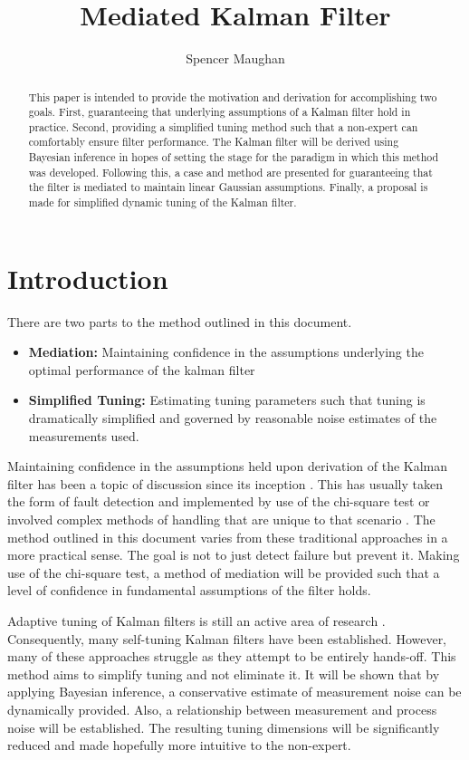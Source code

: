 \documentclass[a4paper]{article}
\title{Mediated Kalman Filter}
\author{Spencer Maughan}
\date{}
\begin{document}
	\maketitle

	\begin{abstract}
		This paper is intended to provide the motivation and derivation for accomplishing two goals. First, guaranteeing that underlying assumptions of a Kalman filter hold in practice. Second, providing a simplified tuning method such that a non-expert can comfortably ensure filter performance. The Kalman filter will be derived using Bayesian inference in hopes of setting the stage for the paradigm in which this method was developed. Following this, a case and method are presented for guaranteeing that the filter is mediated to maintain linear Gaussian assumptions. Finally, a proposal is made for simplified dynamic tuning of the Kalman filter.
	\end{abstract}

	\section{Introduction}
	There are two parts to the method outlined in this document.
	\begin{itemize}
		\item {\bfseries Mediation:} Maintaining confidence in the assumptions underlying the optimal performance of the kalman filter
		\item {\bfseries Simplified Tuning:} Estimating tuning parameters such that tuning is dramatically simplified and governed by reasonable noise estimates of the measurements used.
	\end{itemize}
Maintaining confidence in the assumptions held upon derivation of the Kalman filter has been a topic of discussion since its inception \cite{kalman1960new, maybeck1982stochastic}. This has usually taken the form of fault detection and implemented by use of the chi-square test \cite{jazwinski2007stochastic} or involved complex methods of handling that are unique to that scenario \cite{barfoot2017state}. The method outlined in this document varies from these traditional approaches in a more practical sense. The goal is not to just detect failure but prevent it. Making use of the chi-square test, a method of mediation will be provided such that a level of confidence in fundamental assumptions of the filter holds.

Adaptive tuning of Kalman filters is still an active area of research \cite{simon2006optimal, shumway2017time, sarkka2013bayesian}. Consequently, many self-tuning Kalman filters have been established. However, many of these approaches struggle as they attempt to be entirely hands-off. This method aims to simplify tuning and not eliminate it. It will be shown that by applying Bayesian inference, a conservative estimate of measurement noise can be dynamically provided. Also, a relationship between measurement and process noise will be established. The resulting tuning dimensions will be significantly reduced and made hopefully more intuitive to the non-expert.
\end{document}
